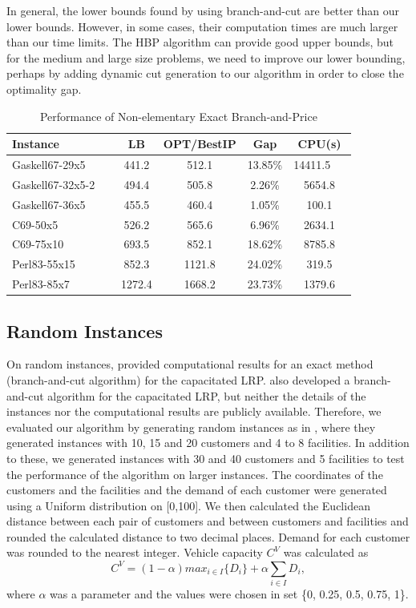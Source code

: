\documentclass[graybox]{./styles/svmult}
\begin{document}
In general, the lower bounds found by using branch-and-cut \citep{Barreto04} 
are better than our lower bounds. However, in some
cases, their computation times are much larger than our time limits.
The HBP algorithm can provide good upper bounds, but for the medium
and large size problems, we need to improve our lower bounding,
perhaps by adding dynamic cut generation to our algorithm in order to
close the optimality gap.
\begin{table}[ht]
\centering
\caption{Performance of Non-elementary Exact Branch-and-Price}\label{brt-gr3}
\begin {tabular}[t]{|l|c|c|c|c|}  
\hline
Instance	        &       LB	&	OPT/BestIP &	Gap    & CPU(s)\\\hline
Gaskell67-29x5 	&	441.2	&	512.1	&	13.85\%	&	14411.5	\ \ \\
Gaskell67-32x5-2 \ \	&	494.4	&	505.8	&	2.26\%	&	5654.8	\\
Gaskell67-36x5 	&	455.5	&	460.4	&	1.05\%	&	100.1\\
C69-50x5 	&	526.2	&	565.6	&	6.96\%	&	2634.1\\
C69-75x10 	&	693.5	&	852.1	&	18.62\%	&	8785.8\\
Perl83-55x15 	&	852.3	&	1121.8	&	24.02\%	&	319.5\\
Perl83-85x7 	&	1272.4	&	1668.2	&	23.73\%	&	1379.6\\
\hline
\end{tabular}
\end{table}

\subsection{Random Instances}
On random instances, \citet{Laporte86} provided computational results
for an exact method (branch-and-cut algorithm) for the capacitated
LRP.
\citet{Belenguer} also developed a branch-and-cut algorithm for the
capacitated LRP, but neither the details of the instances nor the
computational results are publicly available. Therefore, we evaluated
our algorithm by generating random instances as in \citet{Laporte86},
where they generated instances with 10, 15 and 20 customers and 4 to 8
facilities. In addition to these, we generated instances with 30 and
40 customers and 5 facilities to test the performance of the algorithm
on larger instances. The coordinates of the customers and the
facilities and the demand of each customer were generated using a
Uniform distribution on [0,100]. We then calculated the Euclidean
distance between each pair of customers and between customers and
facilities and rounded the calculated distance to two decimal places.
Demand for each customer was rounded to the nearest integer. Vehicle
capacity $C^V$ was calculated as
\begin{equation}
C^V = (1-\alpha) max_{i \in I}\{D_i\} + \alpha \sum_{i \in I}D_i,
\end{equation}   
where $\alpha$ was a parameter and the  values were chosen in set \{0,
0.25, 0.5, 0.75, 1\}.  
\end{document}
